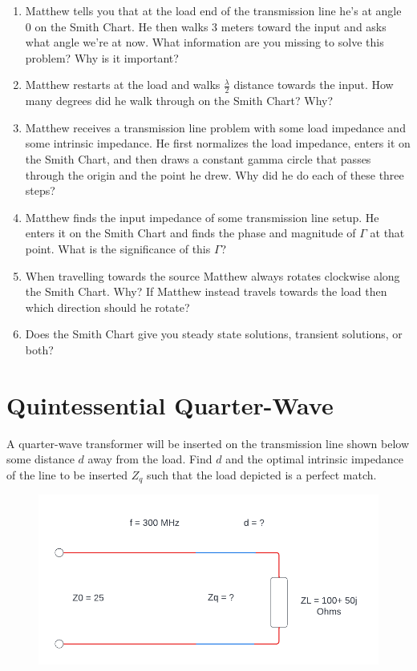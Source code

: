 \documentclass{article}
\begin{document}
\begin{enumerate}
    \item Matthew tells you that at the load end of the transmission line he's at angle 0 on the Smith Chart. He then walks 3 meters toward the input and asks what angle we're at now. What information are you missing to solve this problem? Why is it important?
    \item Matthew restarts at the load and walks $\frac{\lambda}{2}$ distance towards the input. How many degrees did he walk through on the Smith Chart? Why?
    \item Matthew receives a transmission line problem with some load impedance and some intrinsic impedance. He first normalizes the load impedance, enters it on the Smith Chart, and then draws a constant gamma circle that passes through the origin and the point he drew. Why did he do each of these three steps?
    \item Matthew finds the input impedance of some transmission line setup. He enters it on the Smith Chart and finds the phase and magnitude of $\Gamma$ at that point. What is the significance of this $\Gamma$?
    \item When travelling towards the source Matthew always rotates clockwise along the Smith Chart. Why? If Matthew instead travels towards the load then which direction should he rotate?
    \item Does the Smith Chart give you steady state solutions, transient solutions, or both?
\end{enumerate}

\newpage

\section{Quintessential Quarter-Wave}

A quarter-wave transformer will be inserted on the transmission line shown below some distance $d$ away from the load. Find $d$ and the optimal intrinsic impedance of the line to be inserted $Z_q$ such that the load depicted is a perfect match.

\begin{figure}[h]
\begin{center}
    \includegraphics[width= 0.8
    \textwidth]{figures/Quarter_wave_transformer.png}
\end{center}
\end{figure}
\end{document}
